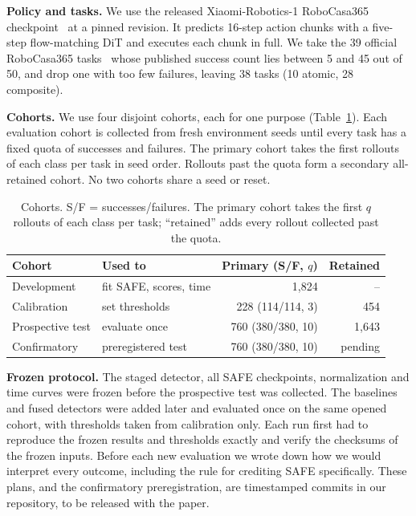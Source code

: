 \documentclass[conference,a4paper]{IEEEtran}
\begin{document}
\textbf{Policy and tasks.} We use the released Xiaomi-Robotics-1 RoboCasa365
checkpoint~\cite{xiaomi2026robotics} at a pinned revision. It predicts 16-step action chunks
with a five-step flow-matching DiT and executes each chunk in full. We take the 39 official
RoboCasa365 tasks~\cite{nasiriany2024robocasa,robocasa365} whose published success count
lies between 5 and 45 out of 50, and drop one with too few failures, leaving 38 tasks
(10 atomic, 28 composite).



\textbf{Cohorts.} We use four disjoint cohorts, each for one purpose
(Table~\ref{tab:cohorts}). Each evaluation cohort is collected from fresh environment
seeds until every task has a fixed quota of successes and failures. The primary cohort
takes the first rollouts of each class per task in seed order. Rollouts past the quota
form a secondary all-retained cohort. No two cohorts share a seed or reset.

\begin{table}[t]
\centering
\caption{Cohorts. S/F = successes/failures. The primary cohort takes the first $q$
rollouts of each class per task; ``retained'' adds every rollout collected past the quota.}
\label{tab:cohorts}
\footnotesize
\begin{tabular}{@{}llrr@{}}
\toprule
Cohort & Used to & Primary (S/F, $q$) & Retained \\
\midrule
Development & fit SAFE, scores, time & 1,824 & -- \\
Calibration & set thresholds & 228 (114/114, 3) & 454 \\
Prospective test & evaluate once & 760 (380/380, 10) & 1,643 \\
Confirmatory & preregistered test & 760 (380/380, 10) & pending \\
\bottomrule
\end{tabular}
\end{table}

\textbf{Frozen protocol.} The staged detector, all SAFE checkpoints, normalization and time
curves were frozen before the prospective test was collected. The baselines and fused
detectors were added later and evaluated once on the same opened cohort, with thresholds
taken from calibration only. Each run first had to reproduce the frozen results and
thresholds exactly and verify the checksums of the frozen inputs. Before each new
evaluation we wrote down how we would interpret every outcome, including the rule for
crediting SAFE specifically. These plans, and the confirmatory preregistration, are
timestamped commits in our repository, to be released with the paper.
\end{document}
